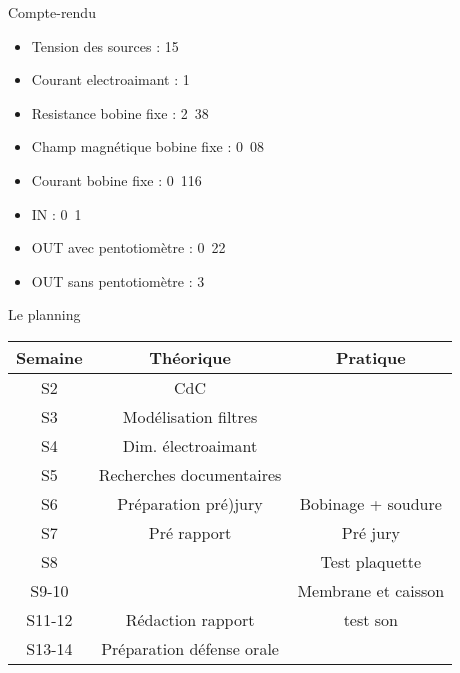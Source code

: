 \documentclass[pdf]{beamer}
\begin{document}
\begin{frame}{Compte-rendu}
	\begin{itemize}
		\item Tension des sources :  \unit{15}{\volt}
		\item Courant electroaimant : \unit{1}{\ampere}
		\item Resistance bobine fixe : \unit{2.38}{\ohm}
		\item Champ magnétique bobine fixe : \unit{0.08}{\tesla}
		\item Courant bobine fixe : \unit{0.116}{\ampere}
		\item IN : \unit{0.1}{\volt}
		\item OUT avec pentotiomètre : \unit{0.22}{\volt}
		\item OUT sans pentotiomètre : \unit{3}{\volt}
	\end{itemize}
\end{frame}

\begin{frame}{Le planning}

		\begin{tabular}{|c|c|c|}
		\hline
		Semaine & Théorique & Pratique \\
		\hline
		S2 & CdC &\\
		\hline
		S3 & Modélisation filtres &\\
		\hline
		S4 & Dim. électroaimant &\\
		\hline
		S5 & Recherches documentaires & \\
		\hline
		S6 & Préparation pré)jury & Bobinage + soudure\\
		\hline
		S7 & Pré rapport & Pré jury\\
		\hline
		S8 & & Test plaquette\\
		\hline
		S9-10 & & Membrane et caisson\\
		\hline
		S11-12 & Rédaction rapport & test son\\
		\hline
		S13-14 & Préparation défense orale &\\
		\hline

		\end{tabular}
\end{frame}
\end{document}

